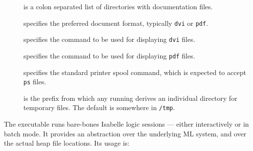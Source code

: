 \begin{isabellebody}
\begin{isamarkuptext}
\begin{description}
  \item[\hypertarget{setting.ISABELLE-DOCS}{\hyperlink{setting.ISABELLE-DOCS}{\mbox{}}}] is a colon separated list of
  directories with documentation files.
  
  \item[\hypertarget{setting.ISABELLE-DOC-FORMAT}{\hyperlink{setting.ISABELLE-DOC-FORMAT}{\mbox{}}}] specifies the preferred
  document format, typically \verb|dvi| or \verb|pdf|.
  
  \item[\hypertarget{setting.DVI-VIEWER}{\hyperlink{setting.DVI-VIEWER}{\mbox{}}}] specifies the command to be used
  for displaying \verb|dvi| files.
  
  \item[\hypertarget{setting.PDF-VIEWER}{\hyperlink{setting.PDF-VIEWER}{\mbox{}}}] specifies the command to be used
  for displaying \verb|pdf| files.
  
  \item[\hypertarget{setting.PRINT-COMMAND}{\hyperlink{setting.PRINT-COMMAND}{\mbox{}}}] specifies the standard printer
  spool command, which is expected to accept \verb|ps| files.
  
  \item[\hypertarget{setting.ISABELLE-TMP-PREFIX}{\hyperlink{setting.ISABELLE-TMP-PREFIX}{\mbox{}}}\isa{{\isachardoublequote}\isactrlsup {\isacharasterisk}{\isachardoublequote}}] is the
  prefix from which any running \hyperlink{executable.isabelle-process}{\mbox{}}
  derives an individual directory for temporary files.  The default is
  somewhere in \verb|/tmp|.
  
  \end{description}%
\end{isamarkuptext}%
\isamarkuptrue%
%
\isamarkuptrue%
%
\begin{isamarkuptext}%
The \hypertarget{executable.isabelle-process}{\hyperlink{executable.isabelle-process}{\mbox{}}} executable runs bare-bones
  Isabelle logic sessions --- either interactively or in batch mode.
  It provides an abstraction over the underlying ML system, and over
  the actual heap file locations.  Its usage is:


\end{isamarkuptext}
\end{isabellebody}

